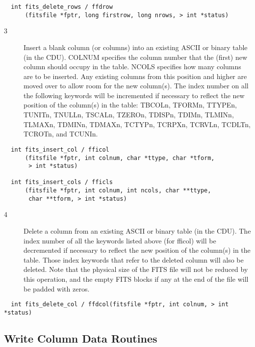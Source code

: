 \begin{verbatim}
  int fits_delete_rows / ffdrow
      (fitsfile *fptr, long firstrow, long nrows, > int *status)
\end{verbatim}

\begin{description}
\item[3 ] Insert a blank column (or columns) into an existing ASCII or binary
    table (in the CDU).  COLNUM specifies the column number that the (first)
    new column should occupy in the table.  NCOLS specifies how many
    columns are to be inserted. Any existing columns from this position and
    higher are moved over to allow room for the new column(s).
    The index number on all the following keywords will be incremented
    if necessary to reflect the new position of the column(s) in the table:
    TBCOLn, TFORMn, TTYPEn, TUNITn, TNULLn, TSCALn, TZEROn, TDISPn, TDIMn,
    TLMINn, TLMAXn, TDMINn, TDMAXn, TCTYPn, TCRPXn, TCRVLn, TCDLTn, TCROTn,
   and TCUNIn.
\end{description}

\begin{verbatim}
  int fits_insert_col / fficol
      (fitsfile *fptr, int colnum, char *ttype, char *tform,
       > int *status)

  int fits_insert_cols / fficls
      (fitsfile *fptr, int colnum, int ncols, char **ttype,
       char **tform, > int *status)
\end{verbatim}

\begin{description}
\item[4 ] Delete a column from an existing ASCII or binary table (in the CDU).
    The index number of all the keywords listed above (for fficol) will be
    decremented if necessary to reflect the new position of the column(s) in
    the table.  Those index keywords that refer to the deleted column will
    also be deleted.  Note that the physical size of the FITS file will
    not be reduced by this operation, and the empty FITS blocks if any
   at the end of the file will be padded with zeros.
\end{description}

\begin{verbatim}
  int fits_delete_col / ffdcol(fitsfile *fptr, int colnum, > int *status)
\end{verbatim}

\subsection{ Write Column Data Routines \label{FFPCLS}}

